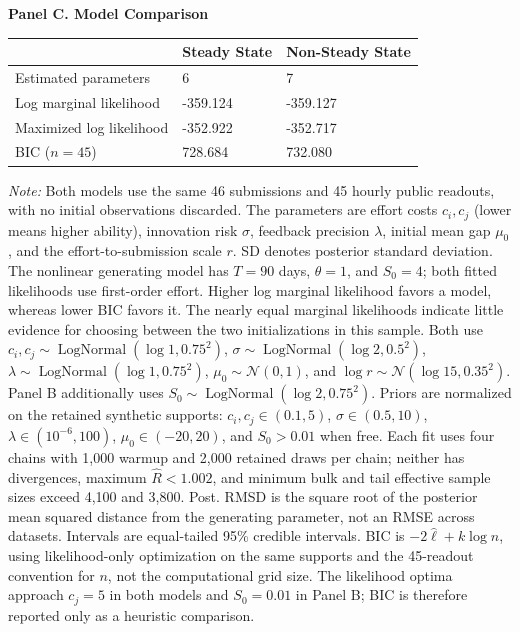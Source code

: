 \documentclass[mnsc]{informs3}
\newcommand{\figtabnotesize}{\TableSpaced\footnotesize}
\begin{document}
\begin{table}[!htbp]
\textbf{Panel C. Model Comparison}\par
\smallskip
\begin{tabularx}{\textwidth}{lYY}
\toprule
 & Steady State & Non-Steady State \\
\midrule
Estimated parameters & 6 & 7 \\
Log marginal likelihood & -359.124 & -359.127 \\
Maximized log likelihood & -352.922 & -352.717 \\
BIC ($n=45$) & 728.684 & 732.080 \\
\bottomrule
\end{tabularx}
\begin{minipage}{\textwidth}\figtabnotesize
{\footnotesize
\medskip
\textit{Note:} Both models use the same 46 submissions and 45 hourly public readouts, with no initial observations discarded. The parameters are effort costs $c_i,c_j$ (lower means higher ability), innovation risk $\sigma$, feedback precision $\lambda$, initial mean gap $\mu_0$, and the effort-to-submission scale $r$. SD denotes posterior standard deviation. The nonlinear generating model has $T=90$ days, $\theta=1$, and $S_0=4$; both fitted likelihoods use first-order effort. Higher log marginal likelihood favors a model, whereas lower BIC favors it. The nearly equal marginal likelihoods indicate little evidence for choosing between the two initializations in this sample. Both use $c_i,c_j\sim\operatorname{LogNormal}(\log1,0.75^2)$, $\sigma\sim\operatorname{LogNormal}(\log2,0.5^2)$, $\lambda\sim\operatorname{LogNormal}(\log1,0.75^2)$, $\mu_0\sim\mathcal N(0,1)$, and $\log r\sim\mathcal N(\log15,0.35^2)$. Panel B additionally uses $S_0\sim\operatorname{LogNormal}(\log2,0.75^2)$. Priors are normalized on the retained synthetic supports: $c_i,c_j\in(0.1,5)$, $\sigma\in(0.5,10)$, $\lambda\in(10^{-6},100)$, $\mu_0\in(-20,20)$, and $S_0>0.01$ when free. Each fit uses four chains with 1,000 warmup and 2,000 retained draws per chain; neither has divergences, maximum $\widehat R<1.002$, and minimum bulk and tail effective sample sizes exceed 4,100 and 3,800. Post. RMSD is the square root of the posterior mean squared distance from the generating parameter, not an RMSE across datasets. Intervals are equal-tailed 95\% credible intervals. BIC is $-2\hat\ell+k\log n$, using likelihood-only optimization on the same supports and the 45-readout convention for $n$, not the computational grid size. The likelihood optima approach $c_j=5$ in both models and $S_0=0.01$ in Panel B; BIC is therefore reported only as a heuristic comparison.
}
\end{minipage}
\end{table}
\end{document}
